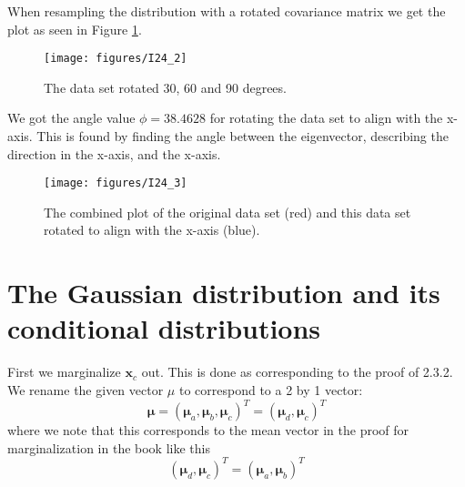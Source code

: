 \documentclass[a4paper, 11pt]{article}
\newcommand{\vect}[1]{\mathbf{#1}}
\begin{document}
When resampling the distribution with a rotated covariance matrix we get the plot as seen in Figure \ref{fig:I24_2}.

\begin{figure}[H]
    \centering
    \texttt{[image: figures/I24\_2]}
    \caption{The data set rotated 30, 60 and 90 degrees.}
    \label{fig:I24_2}
\end{figure}

We got the angle value $\phi = 38.4628$ for rotating the data set to align with the x-axis. This is found by finding the angle between the eigenvector, describing the direction in the x-axis, and the x-axis.
\begin{figure}[H]
    \centering
    \texttt{[image: figures/I24\_3]}
    \caption{The combined plot of the original data set (red) and this data set rotated to align with the x-axis (blue).}
    \label{fig:I24_3}
\end{figure}

\section{The Gaussian distribution and its conditional distributions} 
\label{sec:the_Gaussian_distribution_and_its_conditional_distributions}
First we marginalize $\vect x_c$ out. This is done as corresponding to the proof of 2.3.2.
We rename the given vector $\mu$ to correspond to a 2 by 1 vector:
\[ \boldsymbol \mu = (\boldsymbol \mu_a, \boldsymbol \mu_b, \boldsymbol \mu_c)^T = (\boldsymbol \mu_d, \boldsymbol \mu_c)^T \]
where we note that this corresponds to the mean vector in the proof for marginalization in the book like this
\[ (\boldsymbol \mu_d, \boldsymbol \mu_c)^T =  (\boldsymbol \mu_a, \boldsymbol \mu_b)^T \]
\end{document}
